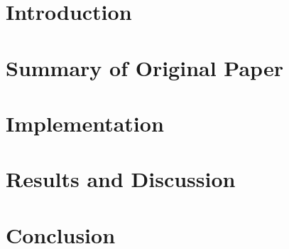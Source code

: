 




\section{Introduction}\label{sec:Introduction}



\section{Summary of Original Paper}\label{sec:Summary_of_origninal_study}



\section{Implementation}\label{sec:Implementation_details}


\section{Results and Discussion}\label{sec:Results_and_Discussion}


\clearpage
\section{Conclusion}\label{sec:Conclusion}

